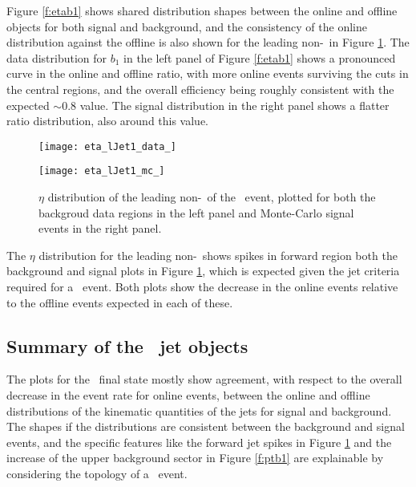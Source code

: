     Figure \ref{f:etab1} shows shared distribution shapes between the online and offline objects for both signal and background, and the consistency of the online distribution against the offline is also shown for the leading non-\bjet\ in Figure \ref{f:etaj1}. The data distribution for $b_1$ in the left panel of Figure \ref{f:etab1} shows a pronounced curve in the online and offline ratio, with more online events surviving the cuts in the central regions, and the overall efficiency being roughly consistent with the expected $\sim0.8$ value. The signal distribution in the right panel shows a flatter ratio distribution, also around this value.

        \begin{figure}[h]
            \centering
            \begin{minipage}[h]{0.48\linewidth}
                \texttt{[image: eta\_lJet1\_data\_]}
            \end{minipage}
            \quad
            \begin{minipage}[h]{0.48\linewidth}
                \texttt{[image: eta\_lJet1\_mc\_]}
            \end{minipage}
            \caption[$\eta$ distribution of the leading non-\bjet\ of the \VBFHBB\ event]{$\eta$ distribution of the leading non-\bjet\ of the \VBFHBB\ event, plotted for both the backgroud data regions in the left panel and Monte-Carlo signal events in the right panel.}
            \label{f:etaj1}
        \end{figure}

        The $\eta$ distribution for the leading non-\bjet\ shows spikes in  forward region  both the background and signal plots in Figure \ref{f:etaj1}, which is expected given the jet criteria required for a \VBFHBB\ event. Both plots show the decrease in the online events relative to the offline events expected in each of these.

    \subsection{Summary of the \VBFHBB\ jet objects}

    The plots for the \VBFHBB\ final state mostly show agreement, with respect to the overall decrease in the event rate for online events, between the online and offline distributions of the kinematic quantities of the jets for signal and background. The shapes if the distributions are consistent between the background and signal events, and the specific features like the forward jet spikes in Figure \ref{f:etaj1} and the increase \pt of the upper background sector in Figure \ref{f:ptb1} are explainable by considering the topology of a \VBFHBB\ event.

